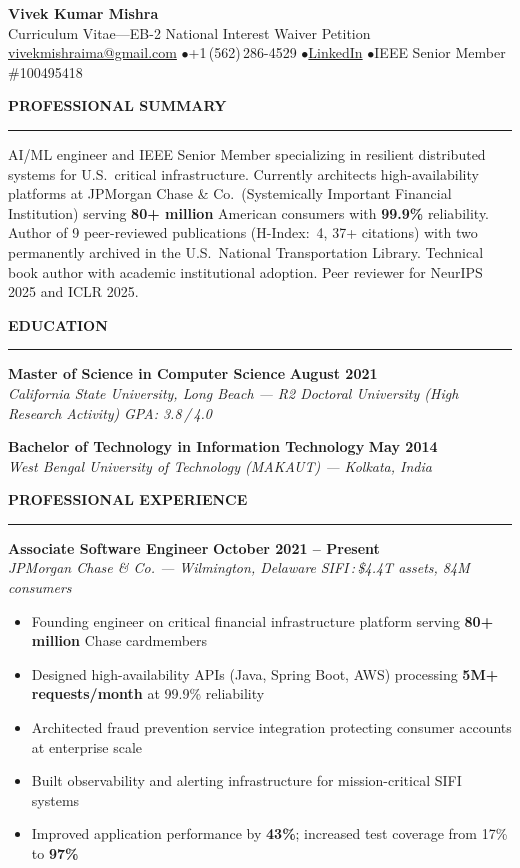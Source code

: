 \documentclass[11pt]{article}
\newcommand{\sect}[1]{%
  \vspace{10pt}%
  {\color{sectioncolor}\large\bfseries\MakeUppercase{#1}}\\[-6pt]%
  {\color{rulecolor}\rule{\textwidth}{1.2pt}}%
  \vspace{4pt}%
}
\newcommand{\job}[4]{%
  \textbf{#1} \hfill \textbf{#2}\\
  \textit{#3} \hfill \textit{#4}%
}
\begin{document}
\begin{center}
{\Huge \textbf{Vivek Kumar Mishra}}\\[6pt]
{\large Curriculum Vitae\quad---\quad EB-2 National Interest Waiver Petition}\\[8pt]
{\small
  \href{mailto:vivekmishraima@gmail.com}{vivekmishraima@gmail.com}
  \quad$\bullet$\quad +1\,(562)\,286-4529
  \quad$\bullet$\quad \href{https://www.linkedin.com/in/vivek-mishra-5a93b568/}{LinkedIn}
  \quad$\bullet$\quad IEEE Senior Member \#100495418
}
\end{center}

\sect{Professional Summary}

AI/ML engineer and IEEE Senior Member specializing in resilient distributed systems for U.S.\ critical infrastructure. Currently architects high-availability platforms at JPMorgan Chase \& Co.\ (Systemically Important Financial Institution) serving \textbf{80+ million} American consumers with \textbf{99.9\%} reliability. Author of 9 peer-reviewed publications (H-Index:~4, 37+ citations) with two permanently archived in the U.S.\ National Transportation Library. Technical book author with academic institutional adoption. Peer reviewer for NeurIPS 2025 and ICLR 2025.

\sect{Education}

\job{Master of Science in Computer Science}{August 2021}%
    {California State University, Long Beach --- R2 Doctoral University (High Research Activity)}{GPA: 3.8\,/\,4.0}

\vspace{6pt}
\job{Bachelor of Technology in Information Technology}{May 2014}%
    {West Bengal University of Technology (MAKAUT) --- Kolkata, India}{}

\sect{Professional Experience}

\job{Associate Software Engineer}{October 2021 -- Present}%
    {JPMorgan Chase \& Co. --- Wilmington, Delaware}%
    {SIFI\,:\,\$4.4T assets, 84M consumers}
\begin{itemize}
\setlength{\itemsep}{1pt}\setlength{\parsep}{0pt}\setlength{\topsep}{3pt}
    \item Founding engineer on critical financial infrastructure platform serving \textbf{80+ million} Chase cardmembers
    \item Designed high-availability APIs (Java, Spring Boot, AWS) processing \textbf{5M+ requests/month} at 99.9\% reliability
    \item Architected fraud prevention service integration protecting consumer accounts at enterprise scale
    \item Built observability and alerting infrastructure for mission-critical SIFI systems
    \item Improved application performance by \textbf{43\%}; increased test coverage from 17\% to \textbf{97\%}
\end{itemize}
\end{document}
